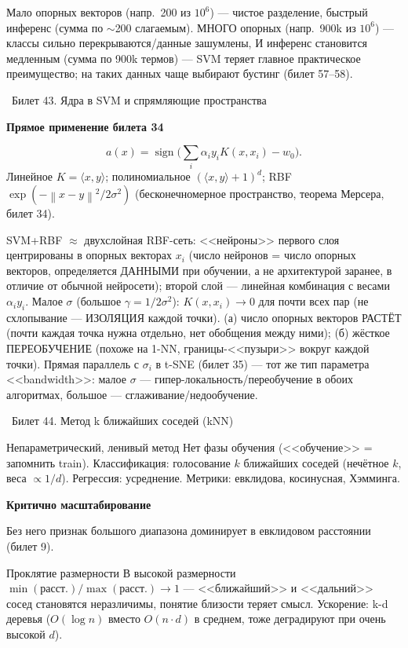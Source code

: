 \documentclass[12pt, a4paper]{article}
\newcommand{\bilet}[2]{%
  \vspace{10pt}%
  \noindent\colorbox{qcolor}{\parbox{\dimexpr\linewidth-2\fboxsep\relax}{%
    \color{white}\large\bfseries\strut\ Билет #1. #2%
  }}%
  \nopagebreak\vspace{5pt}\par\nopagebreak%
}
\newcommand{\qsub}[1]{%
  \vspace{5pt}%
  {\bfseries\color{defblue} #1}%
  \par\vspace{2pt}%
}
\newcommand{\sign}{\operatorname{sign}}
\newcommand{\norm}[1]{\left\lVert #1 \right\rVert}
\begin{document}
\begin{fishkabox}
Мало опорных векторов (напр.\ 200 из $10^6$) --- чистое разделение, быстрый инференс (сумма по $\sim$200 слагаемым). МНОГО опорных (напр.\ 900k из $10^6$) --- классы сильно перекрываются/данные зашумлены, И инференс становится медленным (сумма по 900k термов) --- SVM теряет главное практическое преимущество; на таких данных чаще выбирают бустинг (билет 57--58).
\end{fishkabox}

\bilet{43}{Ядра в SVM и спрямляющие пространства}

\qsub{Прямое применение билета 34}
\[
  a(x)=\sign\Big(\sum_i\alpha_i y_i K(x,x_i)-w_0\Big).
\]
Линейное $K=\langle x,y\rangle$; полиномиальное $(\langle x,y\rangle+1)^d$; RBF $\exp(-\norm{x-y}^2/2\sigma^2)$ (бесконечномерное пространство, теорема Мерсера, билет 34).

\begin{fishkabox}
SVM+RBF $\approx$ двухслойная RBF-сеть: <<нейроны>> первого слоя центрированы в опорных векторах $x_i$ (число нейронов = число опорных векторов, определяется ДАННЫМИ при обучении, а не архитектурой заранее, в отличие от обычной нейросети); второй слой --- линейная комбинация с весами $\alpha_iy_i$.
Малое $\sigma$ (большое $\gamma=1/2\sigma^2$): $K(x,x_i)\to0$ для почти всех пар (не схлопывание --- ИЗОЛЯЦИЯ каждой точки). (а) число опорных векторов РАСТЁТ (почти каждая точка нужна отдельно, нет обобщения между ними); (б) жёсткое ПЕРЕОБУЧЕНИЕ (похоже на 1-NN, границы-<<пузыри>> вокруг каждой точки). Прямая параллель с $\sigma_i$ в t-SNE (билет 35) --- тот же тип параметра <<bandwidth>>: малое $\sigma$ --- гипер-локальность/переобучение в обоих алгоритмах, большое --- сглаживание/недообучение.
\end{fishkabox}

\bilet{44}{Метод k ближайших соседей (kNN)}

\begin{defbox}{Непараметрический, ленивый метод}
Нет фазы обучения (<<обучение>> = запомнить train). Классификация: голосование $k$ ближайших соседей (нечётное $k$, веса $\propto1/d$). Регрессия: усреднение. Метрики: евклидова, косинусная, Хэмминга.
\end{defbox}

\qsub{Критично масштабирование}
Без него признак большого диапазона доминирует в евклидовом расстоянии (билет 9).

\begin{propbox}{Проклятие размерности}
В высокой размерности $\min(\text{расст.})/\max(\text{расст.})\to1$ --- <<ближайший>> и <<дальний>> сосед становятся неразличимы, понятие близости теряет смысл. Ускорение: k-d деревья ($O(\log n)$ вместо $O(n\cdot d)$ в среднем, тоже деградируют при очень высокой $d$).
\end{propbox}
\end{document}
